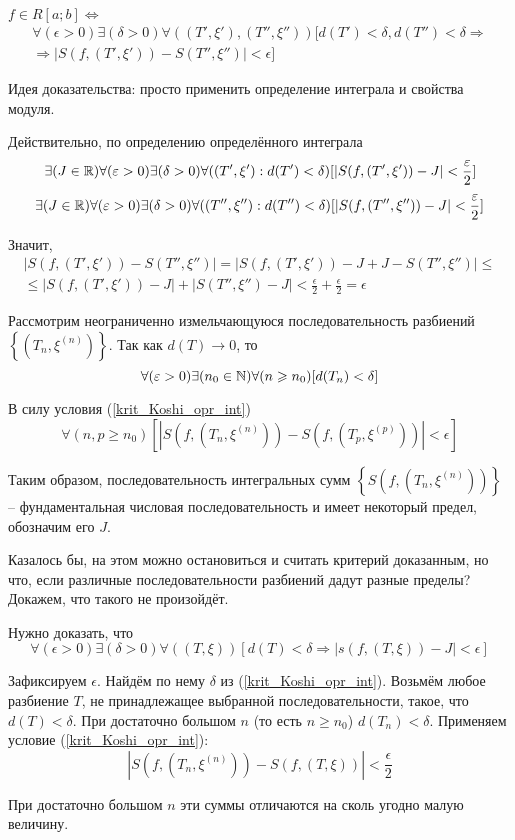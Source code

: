 \begin{teorema}
$f\in R[a;b] \Leftrightarrow $
\begin{multline}\label{krit_Koshi_opr_int}
\forall(\epsilon>0)\exists(\delta>0)\forall((T',\xi'),(T'',\xi''))[d(T')<\delta, d(T'')<\delta \Rightarrow
\\ \Rightarrow
 |S(f,(T',\xi'))-S(T'',\xi'')|<\epsilon]
\end{multline}
\end{teorema}

\dokvo
\neobh
Идея доказательства: просто применить определение интеграла и свойства модуля.

Действительно, по определению определённого интеграла
$$
\exists(J\in \mathbb{R})\forall(\varepsilon>0)\exists(\delta>0)\forall((T',\xi'):d(T')<\delta)[|S(f,(T',\xi'))-J|<\frac{\varepsilon}{2}]
$$
$$
\exists(J\in \mathbb{R})\forall(\varepsilon>0)\exists(\delta>0)\forall((T'',\xi''):d(T'')<\delta)[|S(f,(T'',\xi''))-J|<\frac{\varepsilon}{2}]
$$

Значит, 
\begin{multline*}
|S(f,(T',\xi'))-S(T'',\xi'')|= |S(f,(T',\xi'))-J+J-S(T'',\xi'')|\leq
\\ \leq
|S(f,(T',\xi'))-J|+|S(T'',\xi'')-J|<\frac\epsilon{2}+\frac\epsilon{2}=\epsilon
\end{multline*}
\dokno

\dost

Рассмотрим неограниченно измельчающуюся последовательность разбиений $\left\{\left(T_n,\xi^{(n)}\right)\right\}$.
Так как $d(T)\to 0$, то
$$
\forall(\varepsilon>0)\exists(n_0\in\mathbb{N})\forall(n\geqslant n_0)[d(T_n)<\delta]
$$

В силу условия (\ref{krit_Koshi_opr_int})
$$
\forall(n,p\geq n_0)\left[\left|S\left(f,\left(T_n,\xi^{(n)}\right)\right)-S\left(f,\left(T_p,\xi^{(p)}\right)\right)\right|<\epsilon\right]
$$

Таким образом, последовательность интегральных сумм $\left\{S\left(f,\left(T_n,\xi^{(n)}\right)\right)\right\}$ -- фундаментальная числовая последовательность и имеет некоторый предел, обозначим его $J$.

Казалось бы, на этом можно остановиться и считать критерий доказанным, но что, если различные последовательности разбиений дадут разные пределы?
Докажем, что такого не произойдёт.

Нужно доказать, что
$$
\forall(\epsilon>0)\exists(\delta>0)\forall((T,\xi))[d(T)<\delta \Rightarrow |s(f,(T,\xi))-J|<\epsilon]
$$

Зафиксируем $\epsilon$.
Найдём по нему $\delta$ из (\ref{krit_Koshi_opr_int}).
Возьмём любое разбиение $T$, не принадлежащее выбранной последовательности, такое, что $d(T)<\delta$.
При достаточно большом $n$ (то есть $n\geq n_0$) $d(T_n)<\delta$.
Применяем условие (\ref{krit_Koshi_opr_int}):
$$
\left|S\left(f,\left(T_n,\xi^{(n)}\right)\right)-S\left(f,\left(T,\xi\right)\right)\right|<\frac\epsilon{2}
$$

При достаточно большом $n$ эти суммы отличаются на сколь угодно малую величину.

\dokno




